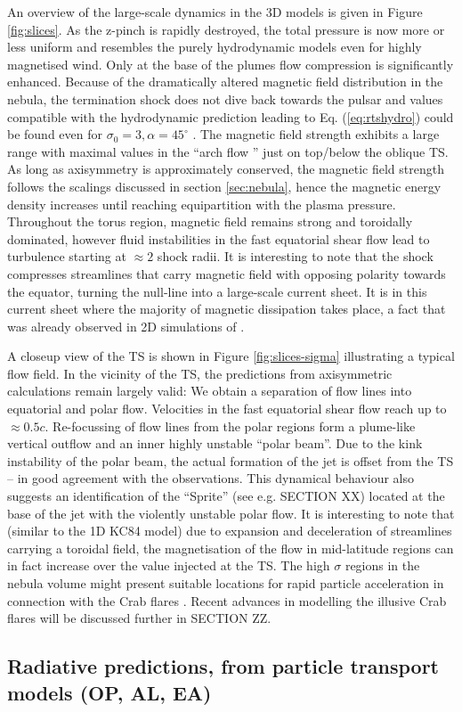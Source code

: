 An overview of the large-scale dynamics in the 3D models is given in Figure \ref{fig:slices}.  As the z-pinch is rapidly destroyed, the total pressure is now more or less uniform and resembles the purely hydrodynamic models even for highly magnetised wind.  
Only at the base of the plumes flow compression is significantly enhanced.  
Because of the dramatically altered magnetic field distribution in the nebula, the termination shock does not dive back towards the pulsar and values compatible with the hydrodynamic prediction leading to Eq. (\ref{eq:rtshydro}) could be found even for $\sigma_0=3,\alpha=45^\circ$ \citep{PorthKomissarov2014a}.  
The magnetic field strength exhibits a large range with maximal values in the ``arch flow '' just on top/below the oblique TS.  As long as axisymmetry is approximately conserved, the magnetic field strength follows the scalings discussed in section \ref{sec:nebula}, hence the magnetic energy density increases until reaching equipartition with the plasma pressure.  Throughout the torus region, magnetic field remains strong and toroidally dominated, however fluid instabilities in the fast equatorial shear flow lead to turbulence starting at $\approx 2 $ shock radii.  It is interesting to note that the shock compresses streamlines that carry magnetic field with opposing polarity towards the equator, turning the null-line into a large-scale current sheet.  It is in this current sheet where the majority of magnetic dissipation takes place, a fact that was already observed in 2D simulations of \cite{camus2009}.  

A  closeup view of the TS is shown in Figure \ref{fig:slices-sigma} illustrating a typical flow field.  In the vicinity of the TS, the predictions from axisymmetric calculations remain largely valid:  We obtain a separation of flow lines into equatorial and polar flow.  Velocities in the fast equatorial shear flow reach up to $\approx0.5c$.  Re-focussing of flow lines from the polar regions form a plume-like vertical outflow and an inner highly unstable ``polar beam''.  Due to the kink instability of the polar beam, the actual formation of the jet is offset from the TS -- in good agreement with the observations.  This dynamical behaviour also suggests an identification of the ``Sprite'' (see e.g. SECTION XX) located at the base of the jet  with the violently unstable polar flow.  
It is interesting to note that (similar to the 1D KC84 model) due to expansion and deceleration of streamlines carrying a toroidal field, the magnetisation of the flow in mid-latitude regions can in fact increase over the value injected at the TS.  The high $\sigma$ regions in the nebula volume might present suitable locations for rapid particle acceleration in connection with the Crab flares \citep[e.g.][]{LyutikovSironi2016}.  Recent advances in modelling the illusive Crab flares will be discussed further in SECTION ZZ.  



\subsection{Radiative predictions, from particle transport models      (OP, AL, EA)}
